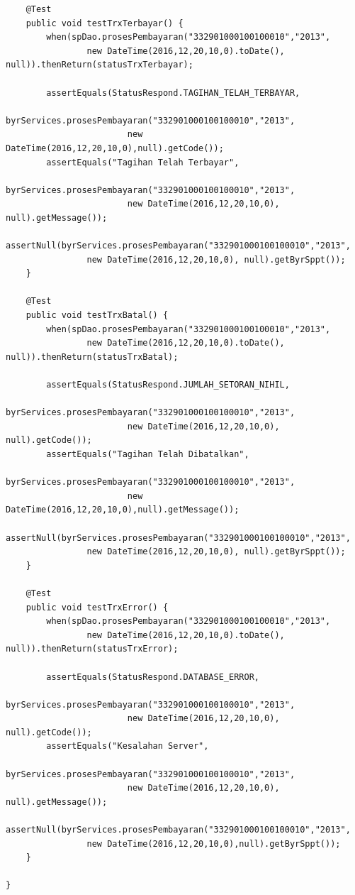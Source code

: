 \documentclass[pdftex,12pt, oneside]{article}
\begin{document}
\begin{enumerate}[A.]
\begin{enumerate}[1.]
\begin{lstlisting}
    @Test
    public void testTrxTerbayar() {
        when(spDao.prosesPembayaran("332901000100100010","2013",
                new DateTime(2016,12,20,10,0).toDate(), null)).thenReturn(statusTrxTerbayar);

        assertEquals(StatusRespond.TAGIHAN_TELAH_TERBAYAR,
                byrServices.prosesPembayaran("332901000100100010","2013",
                        new DateTime(2016,12,20,10,0),null).getCode());
        assertEquals("Tagihan Telah Terbayar",
                byrServices.prosesPembayaran("332901000100100010","2013",
                        new DateTime(2016,12,20,10,0), null).getMessage());
        assertNull(byrServices.prosesPembayaran("332901000100100010","2013",
                new DateTime(2016,12,20,10,0), null).getByrSppt());
    }

    @Test
    public void testTrxBatal() {
        when(spDao.prosesPembayaran("332901000100100010","2013",
                new DateTime(2016,12,20,10,0).toDate(), null)).thenReturn(statusTrxBatal);

        assertEquals(StatusRespond.JUMLAH_SETORAN_NIHIL,
                byrServices.prosesPembayaran("332901000100100010","2013",
                        new DateTime(2016,12,20,10,0), null).getCode());
        assertEquals("Tagihan Telah Dibatalkan",
                byrServices.prosesPembayaran("332901000100100010","2013",
                        new DateTime(2016,12,20,10,0),null).getMessage());
        assertNull(byrServices.prosesPembayaran("332901000100100010","2013",
                new DateTime(2016,12,20,10,0), null).getByrSppt());
    }

    @Test
    public void testTrxError() {
        when(spDao.prosesPembayaran("332901000100100010","2013",
                new DateTime(2016,12,20,10,0).toDate(), null)).thenReturn(statusTrxError);

        assertEquals(StatusRespond.DATABASE_ERROR,
                byrServices.prosesPembayaran("332901000100100010","2013",
                        new DateTime(2016,12,20,10,0), null).getCode());
        assertEquals("Kesalahan Server",
                byrServices.prosesPembayaran("332901000100100010","2013",
                        new DateTime(2016,12,20,10,0), null).getMessage());
        assertNull(byrServices.prosesPembayaran("332901000100100010","2013",
                new DateTime(2016,12,20,10,0),null).getByrSppt());
    }

}
    \end{lstlisting}
    

\end{enumerate}
\end{enumerate}
\end{document}
